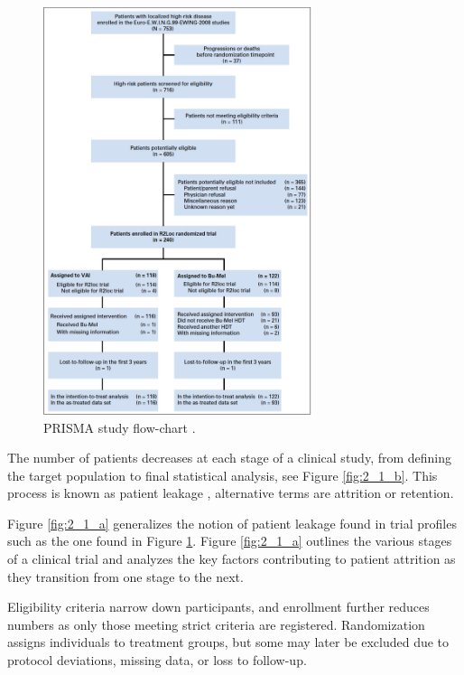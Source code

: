 \begin{figure}[h]
  \centering
  \includegraphics[width=0.7\textwidth]{whelan_flow.png}
  \caption{PRISMA study flow-chart \citep{whelan2018high}.}
  \label{fig:2_0}
\end{figure}

The number of patients decreases at each stage of a clinical study, from defining the target population to final statistical analysis, see Figure \ref{fig:2_1_b}. This process is known as patient leakage \citep{desai2014preventing}, alternative terms are attrition or retention.

Figure \ref{fig:2_1_a} generalizes the notion of patient leakage found in trial profiles such as the one found in Figure \ref{fig:2_0}. Figure \ref{fig:2_1_a} outlines the various stages of a clinical trial and analyzes the key factors contributing to patient attrition as they transition from one stage to the next.

Eligibility criteria narrow down participants, and enrollment further reduces numbers as only those meeting strict criteria are registered. Randomization assigns individuals to treatment groups, but some may later be excluded due to protocol deviations, missing data, or loss to follow-up. 


